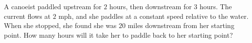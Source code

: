 A canoeist paddled upstream for $2$ hours, then downstream for $3$ hours. The current flows at $2$ mph, and she paddles at a constant speed relative to the water. When she stopped, she found she was $20$ miles downstream from her starting point. How many hours will it take her to paddle back to her starting point?
